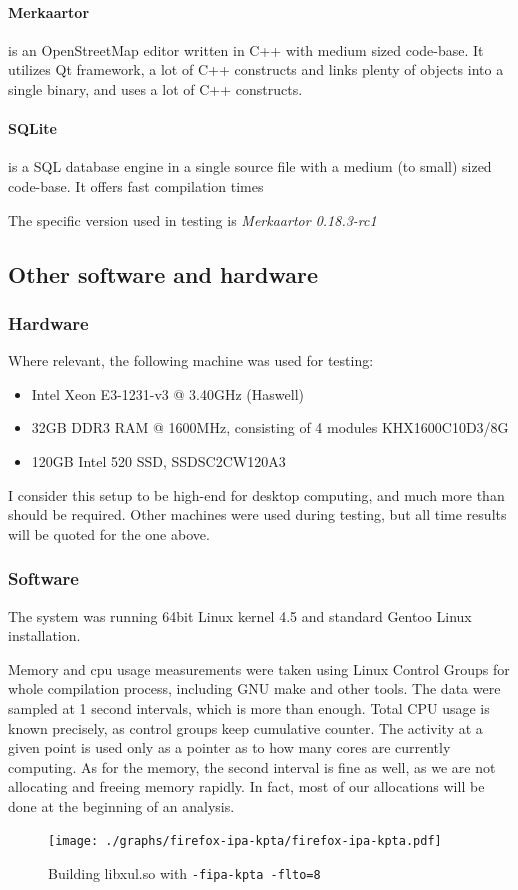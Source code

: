 \paragraph{Merkaartor} is an OpenStreetMap editor written in C++ with medium
sized code-base. It utilizes Qt framework, a lot of C++ constructs and links
plenty of objects into a single binary, and uses a lot of C++ constructs.

\paragraph{SQLite} is a SQL database engine in a single source file with a
medium (to small) sized code-base. It offers fast compilation times 

The specific version used in testing is {\it Merkaartor 0.18.3-rc1}

\subsection{Other software and hardware}

\subsubsection{Hardware}

Where relevant, the following machine was used for testing:

\begin{itemize}
	\item Intel Xeon E3-1231-v3 @ 3.40GHz (Haswell)
	\item 32GB DDR3 RAM @ 1600MHz, consisting of 4 modules KHX1600C10D3/8G
	\item 120GB Intel 520 SSD, SSDSC2CW120A3
\end{itemize}

I consider this setup to be high-end for desktop computing, and much more than
should be required. Other machines were used during testing, but all time
results will be quoted for the one above.

\subsubsection{Software}

The system was running 64bit Linux kernel 4.5 and standard Gentoo Linux
installation. 

Memory and cpu usage measurements were taken using Linux Control Groups for
whole compilation process, including GNU make and other tools. The data were
sampled at 1 second intervals, which is more than enough. Total CPU usage is
known precisely, as control groups keep cumulative counter. The activity at a
given point is used only as a pointer as to how many cores are currently
computing. As for the memory, the second interval is fine as well, as we are not
allocating and freeing memory rapidly. In fact, most of our allocations will be
done at the beginning of an analysis.

\begin{figure}[h!]
	\label{figure-firefox-ipa-kpta}
	\centering
	\texttt{[image: ./graphs/firefox-ipa-kpta/firefox-ipa-kpta.pdf]}
	\caption{Building libxul.so with {\tt -fipa-kpta -flto=8}}
\end{figure}
